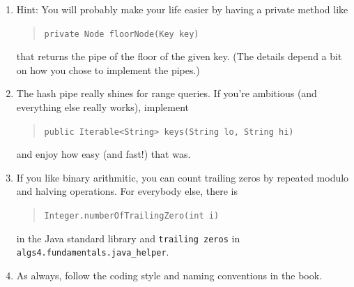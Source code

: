 \documentclass{tufte-handout}
\begin{document}
\begin{enumerate}
  \item Hint: You will probably make your life easier by having  a private method like \begin{quote}
    \tt private Node floorNode(Key key)
    \end{quote}
    that returns the pipe of the floor of the given key.
      (The details depend a bit on how you chose to implement the pipes.)


    \item The hash pipe really shines for range queries.
      If you're ambitious (and everything else really works), implement 
      \begin{quote}
	\tt public Iterable<String> keys(String lo, String hi)
      \end{quote}
      and enjoy how easy (and fast!) that was.

    \item If you like binary arithmitic, you can count trailing zeros by repeated modulo and halving operations.
      For everybody else, there is 
    \begin{quote}
    \tt Integer.numberOfTrailingZero(int i)
  \end{quote}
  in the Java standard library and \texttt{trailing zeros} in \texttt{algs4.fundamentals.java\_helper}.

    \item As always, follow the coding style and naming conventions in the book.

\end{enumerate}
\end{document}
